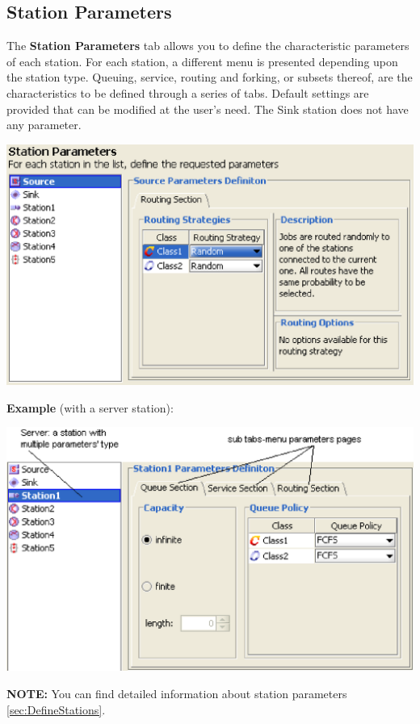 \subsection{Station Parameters}
\label{sec:StationParameters}
The \textbf{Station Parameters} tab allows you to define the characteristic parameters of each station.
For each station, a different menu is presented depending upon the station type. Queuing, service, routing and forking, or subsets thereof, are the characteristics to be defined through a series of tabs. Default settings are provided that can be modified at the user's need. The Sink station does not have any parameter.
\begin{center}
\includegraphics[scale=.5]{img/jsim/station_parameters1.eps}
\end{center}
\textbf{Example }(with a server station):
\begin{center}
\includegraphics[scale=.5]{img/jsim/sub_tabs_menu.eps}
\end{center}
\textbf{NOTE:} You can find detailed information about station parameters \autoref{sec:DefineStations}.

